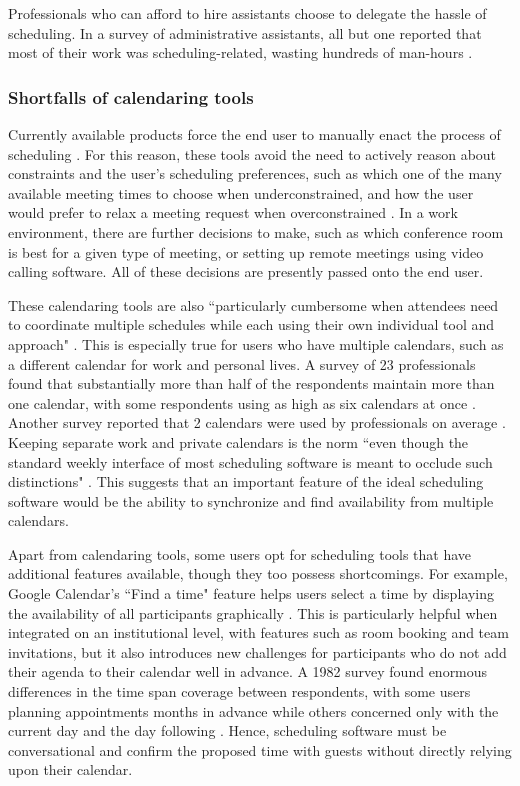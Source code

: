 \documentclass{article}
\begin{document}
Professionals who can afford to hire assistants choose to delegate the hassle of scheduling. In a survey of administrative assistants, all but one reported that most of their work was scheduling-related, wasting hundreds of man-hours \cite{erickson_assistance_2008}.

\subsubsection{Shortfalls of calendaring tools}

Currently available products force the end user to manually enact the process of scheduling \cite{jennings_agent-based_1995}. For this reason, these tools avoid the need to actively reason about constraints and the user's scheduling preferences, such as which one of the many available meeting times to choose when underconstrained, and how the user would prefer to relax a meeting request when overconstrained \cite{berry_ptime_2011}. In a work environment, there are further decisions to make, such as which conference room is best for a given type of meeting, or setting up remote meetings using video calling software. All of these decisions are presently passed onto the end user.

These calendaring tools are also ``particularly cumbersome when attendees need to coordinate multiple schedules while each using their own individual tool and approach" \cite{cranshaw_calendarhelp_2017}. This is especially true for users who have multiple calendars, such as a different calendar for work and personal lives. A survey of 23 professionals found that substantially more than half of the respondents maintain more than one calendar, with some respondents using as high as six calendars at once \cite{kelley_how_1982}. Another survey reported that 2 calendars were used by professionals on average \cite{kincaid_electronic_1985}. Keeping separate work and private calendars is the norm ``even though the standard weekly interface of most scheduling software is meant to occlude such distinctions" \cite{wajcman_digital_2019}. This suggests that an important feature of the ideal scheduling software would be the ability to synchronize and find availability from multiple calendars.

Apart from calendaring tools, some users opt for scheduling tools that have additional features available, though they too possess shortcomings. For example, Google Calendar's ``Find a time" feature helps users select a time by displaying the availability of all participants graphically \cite{noauthor_google_2016}. This is particularly helpful when integrated on an institutional level, with features such as room booking and team invitations, but it also introduces new challenges for participants who do not add their agenda to their calendar well in advance. A 1982 survey found enormous differences in the time span coverage between respondents, with some users planning appointments months in advance while others concerned only with the current day and the day following \cite{kelley_how_1982}. Hence, scheduling software must be conversational and confirm the proposed time with guests without directly relying upon their calendar.
\end{document}
